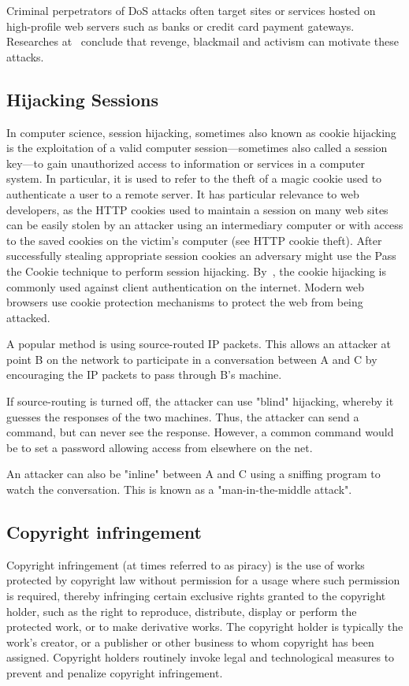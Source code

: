 Criminal perpetrators of DoS attacks often target sites or services hosted on high-profile web servers such as banks or
credit card payment gateways.
Researches at~\cite{prince2016empty, halpin2012philosophy} conclude that revenge, blackmail and activism can motivate these attacks.

\subsection{Hijacking Sessions}\label{subsec:hijacking-sessions}
In computer science, session hijacking, sometimes also known as cookie hijacking is the exploitation of a valid computer
session—sometimes also called a session key—to gain unauthorized access to information or services in a computer system.
In particular, it is used to refer to the theft of a magic cookie used to authenticate a user to a remote server.
It has particular relevance to web developers, as the HTTP cookies used to maintain a session on many web sites
can be easily stolen by an attacker using an intermediary computer or with access to the saved cookies on the victim's
computer (see HTTP cookie theft).
After successfully stealing appropriate session cookies an adversary might use the Pass the Cookie technique to perform
session hijacking.
By~\cite{bugliesi2015cookiext}, the cookie hijacking is commonly used against client authentication on the internet.
Modern web browsers use cookie protection mechanisms to protect the web from being attacked.

A popular method is using source-routed IP packets.
This allows an attacker at point B on the network to participate in a conversation between A and C by encouraging the
IP packets to pass through B's machine.

If source-routing is turned off, the attacker can use "blind" hijacking, whereby it guesses the responses of the two
machines.
Thus, the attacker can send a command, but can never see the response.
However, a common command would be to set a password allowing access from elsewhere on the net.

An attacker can also be "inline" between A and C using a sniffing program to watch the conversation.
This is known as a "man-in-the-middle attack".

\subsection{Copyright infringement}\label{subsec:copyright-infringement}
Copyright infringement (at times referred to as piracy) is the use of works protected by copyright law without
permission for a usage where such permission is required, thereby infringing certain exclusive rights granted to the
copyright holder, such as the right to reproduce, distribute, display or perform the protected work, or to make
derivative works.
The copyright holder is typically the work's creator, or a publisher or other business to whom copyright has been assigned.
Copyright holders routinely invoke legal and technological measures to prevent and penalize copyright infringement.

